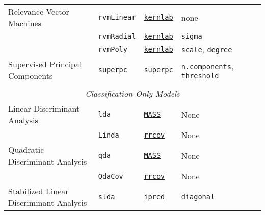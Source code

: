 \documentclass[12pt]{article}
\begin{document}
\begin{landscape}
\begin{longtable}{lllll}
      Relevance Vector Machines  &
         \texttt{rvmLinear} & 
             {\tt \href{http://cran.r-project.org/web/packages/kernlab/index.html}{kernlab}}        & 
            none \\            
             
  &
         \texttt{rvmRadial} & 
            {\tt \href{http://cran.r-project.org/web/packages/kernlab/index.html}{kernlab}}       & 
            \texttt{sigma} \\              
           
  &
         \texttt{rvmPoly} & 
            {\tt \href{http://cran.r-project.org/web/packages/kernlab/index.html}{kernlab}}       & 
            \texttt{scale}, \texttt{degree} \\                        

\rowcolor[rgb]{.95, .95, .95}
            
      Supervised Principal Components&
         \texttt{superpc}  &
         {\tt \href{http://cran.r-project.org/web/packages/superpc/index.html}{superpc}} &
         \texttt{n.components}, \texttt{threshold}\\
            
\\             
\multicolumn{5}{c}{{{\em Classification Only Models}}} \\ 

\rowcolor[rgb]{.95, .95, .95}         
      Linear Discriminant Analysis &
         \texttt{lda} & 
             {\tt \href{http://cran.r-project.org/web/packages/MASS/index.html}{MASS}}       &          
            None\\
\rowcolor[rgb]{.95, .95, .95}                     
          &
         \texttt{Linda} & 
              {\tt \href{http://cran.r-project.org/web/packages/rrcov/index.html}{rrcov}}       &          
            None\\
                        
            
      Quadratic Discriminant Analysis &
         \texttt{qda} & 
             {\tt \href{http://cran.r-project.org/web/packages/MASS/index.html}{MASS}}         &          
            None\\  
      &   \texttt{QdaCov} & 
             {\tt \href{http://cran.r-project.org/web/packages/rrcov/index.html}{rrcov}}        &          
            None\\            
            
\rowcolor[rgb]{.95, .95, .95}                     
      Stabilized Linear Discriminant Analysis&
         \texttt{slda} & 
              {\tt \href{http://cran.r-project.org/web/packages/ipred/index.html}{ipred}}        &          
            \texttt{diagonal}\\  
      

\end{longtable}
\end{landscape}
\end{document}

